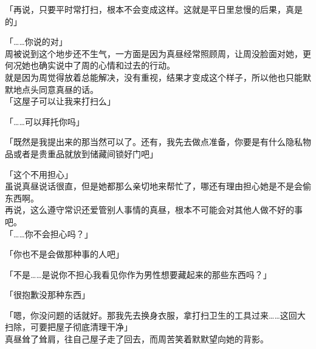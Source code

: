 「再说，只要平时常打扫，根本不会变成这样。这就是平日里怠慢的后果，真是的」

「……你说的对」\\

周被说到这个地步还不生气，一方面是因为真昼经常照顾周，让周没脸面对她，更何况她也确实说中了周的心情和过去的行动。\\

就是因为周觉得放着总能解决，没有重视，结果才变成这个样子，所以他也只能默默地点头同意真昼的话。\\

「这屋子可以让我来打扫么」

「……可以拜托你吗」

「既然是我提出来的那当然可以了。还有，我先去做点准备，你要是有什么隐私物品或者是贵重品就放到储藏间锁好门吧」

「这个不用担心」\\

虽说真昼说话很直，但是她都那么亲切地来帮忙了，哪还有理由担心她是不是会偷东西啊。\\

再说，这么遵守常识还爱管别人事情的真昼，根本不可能会对其他人做不好的事吧。\\

「……你不会担心吗？」

「你也不是会做那种事的人吧」

「不是……是说你不担心我看见你作为男性想要藏起来的那些东西吗？」

「很抱歉没那种东西」

「嗯，你没问题的话就好。那我先去换身衣服，拿打扫卫生的工具过来……这回大扫除，可要把屋子彻底清理干净」\\

真昼耸了耸肩，往自己屋子走了回去，而周苦笑着默默望向她的背影。
